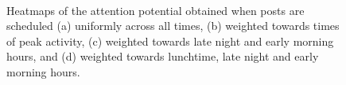 \documentclass[onesided,asymmetric]{tufte-book}
\begin{document}
\begin{figure}[t]
    \\
    \label{fig:attention-potential}
    \caption[Heatmaps of attention potential for the selected scheduling strategies.]{Heatmaps of the attention potential obtained when posts are scheduled (a) uniformly across all times, (b) weighted towards times of peak activity, (c) weighted towards late night and early morning hours, and (d) weighted towards lunchtime, late night and early morning hours.}
\end{figure}
\end{document}
